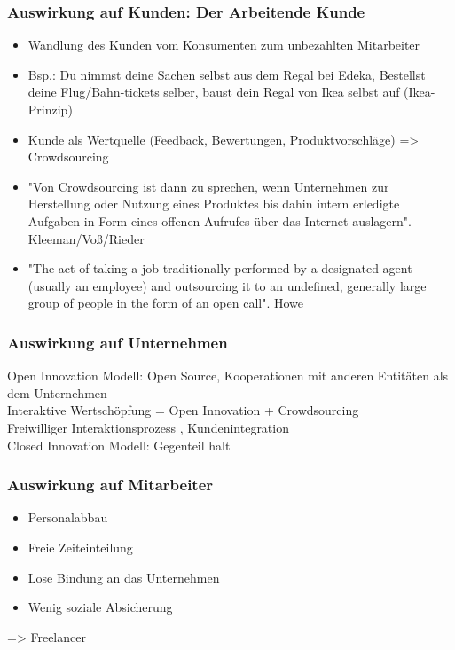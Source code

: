 	\subsubsection{Auswirkung auf Kunden: Der Arbeitende Kunde}
	\begin{itemize}
	\item Wandlung des Kunden vom Konsumenten zum unbezahlten Mitarbeiter
	\item Bsp.: Du nimmst deine Sachen selbst aus dem Regal bei Edeka, Bestellst deine Flug/Bahn-tickets selber, baust dein Regal von Ikea selbst auf (Ikea-Prinzip)
	\item Kunde als Wertquelle (Feedback, Bewertungen, Produktvorschläge) => Crowdsourcing
	\item
	"Von Crowdsourcing ist dann zu sprechen, wenn Unternehmen zur Herstellung oder Nutzung eines Produktes bis dahin intern erledigte Aufgaben in Form eines offenen Aufrufes über das Internet auslagern". Kleeman/Voß/Rieder
	\item
	"The act of taking a job traditionally performed by a designated agent (usually an employee) and outsourcing it to an undefined, generally large group of people in the form of an open call". Howe
	\end{itemize}
	\begin{multicols}{2}
	\subsubsection{Auswirkung auf Unternehmen}
	Open Innovation Modell: Open Source, Kooperationen mit anderen Entitäten als dem Unternehmen \\ 
	Interaktive Wertschöpfung = Open Innovation + Crowdsourcing \\ Freiwilliger Interaktionsprozess , Kundenintegration \\
	Closed Innovation Modell: Gegenteil halt
	\subsubsection{Auswirkung auf Mitarbeiter}
	\begin{itemize}
	\item Personalabbau
	\item Freie Zeiteinteilung
	\item Lose Bindung an das Unternehmen
	\item Wenig soziale Absicherung
	\end{itemize}
	=> Freelancer
	\end{multicols}